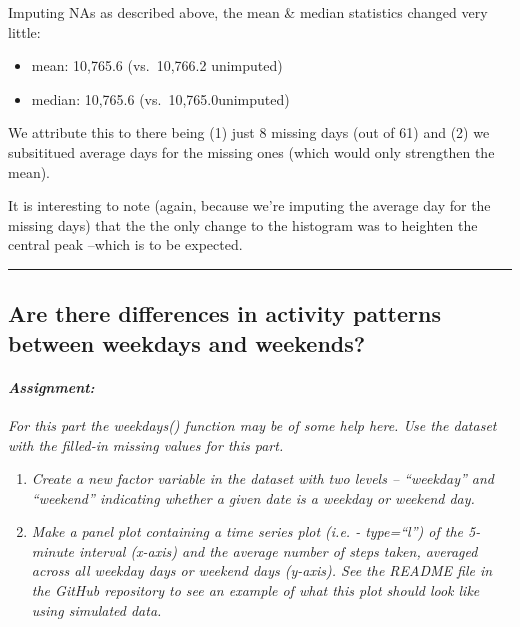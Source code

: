 \documentclass[]{article}
\providecommand{\tightlist}{%
  \setlength{\itemsep}{0pt}\setlength{\parskip}{0pt}}
\let\oldparagraph\paragraph
\renewcommand{\paragraph}[1]{\oldparagraph{#1}\mbox{}}
\begin{document}
Imputing NAs as described above, the mean \& median statistics changed
very little:

\begin{itemize}
\tightlist
\item
  mean: 10,765.6 (vs.~10,766.2 unimputed)\\
\item
  median: 10,765.6 (vs.~10,765.0unimputed)
\end{itemize}

We attribute this to there being (1) just 8 missing days (out of 61) and
(2) we subsititued average days for the missing ones (which would only
strengthen the mean).

It is interesting to note (again, because we're imputing the average day
for the missing days) that the the only change to the histogram was to
heighten the central peak --which is to be expected.

\begin{center}\rule{0.5\linewidth}{\linethickness}\end{center}

\hypertarget{are-there-differences-in-activity-patterns-between-weekdays-and-weekends}{%
\subsection{Are there differences in activity patterns between weekdays
and
weekends?}\label{are-there-differences-in-activity-patterns-between-weekdays-and-weekends}}

\hypertarget{assignment-5}{%
\paragraph{\texorpdfstring{\emph{Assignment:}}{Assignment:}}\label{assignment-5}}

\emph{For this part the weekdays() function may be of some help here.
Use the dataset with the filled-in missing values for this part.}

\begin{enumerate}
\def\labelenumi{\arabic{enumi}.}
\tightlist
\item
  \emph{Create a new factor variable in the dataset with two levels --
  ``weekday'' and ``weekend'' indicating whether a given date is a
  weekday or weekend day.}
\item
  \emph{Make a panel plot containing a time series plot (i.e. -
  type=``l'') of the 5-minute interval (x-axis) and the average number
  of steps taken, averaged across all weekday days or weekend days
  (y-axis). See the README file in the GitHub repository to see an
  example of what this plot should look like using simulated data.}
\end{enumerate}
\end{document}
